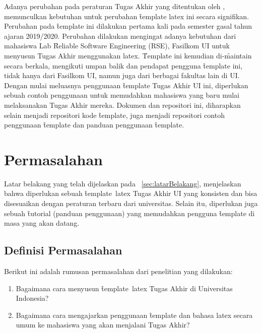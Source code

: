 Adanya perubahan pada peraturan Tugas Akhir yang ditentukan oleh \cite{ui:pedoman_ta}, memunculkan kebutuhan untuk perubahan \f{template} \gls{latex} ini secara signifikan.
Perubahan pada \f{template} ini dilakukan pertama kali pada semester gasal tahun ajaran 2019/2020.
Perubahan dilakukan mengingat adanya kebutuhan dari mahasiswa Lab \f{Reliable Software Engineering} (RSE), Fasilkom UI untuk menyusun Tugas Akhir menggunakan \gls{latex}.
\f{Template} ini kemudian di-\f{maintain} secara berkala, mengikuti umpan balik dan pendapat pengguna \f{template} ini, tidak hanya dari Fasilkom UI, namun juga dari berbagai fakultas lain di UI.
Dengan mulai meluasnya penggunaan \f{template} Tugas Akhir UI ini, diperlukan sebuah contoh penggunaan untuk memudahkan mahasiswa yang baru mulai melaksanakan Tugas Akhir mereka.
Dokumen dan repositori ini, diharapkan selain menjadi repositori kode \f{template}, juga menjadi repositori contoh penggunaan \f{template} dan panduan penggunaan \f{template}.



\section{Permasalahan}
\label{sec:masalah}

Latar belakang yang telah dijelaskan pada \sect~\ref{sec:latarBelakang}, menjelaskan bahwa diperlukan sebuah \f{template}~\gls{latex} Tugas Akhir UI yang konsisten dan bisa disesuaikan dengan peraturan terbaru dari universitas.
Selain itu, diperlukan juga sebuah \f{tutorial} (panduan penggunaan) yang memudahkan pengguna \f{template} di masa yang akan datang.

\subsection{Definisi Permasalahan}
\label{sec:definisiMasalah}
Berikut ini adalah rumusan permasalahan dari penelitian yang dilakukan:
\begin{enumerate}
	\item Bagaimana cara menyusun \f{template}~\gls{latex} Tugas Akhir di Universitas Indonesia?
	\item Bagaimana cara mengajarkan penggunaan \f{template} dan bahasa \gls{latex} secara umum ke mahasiswa yang akan menjalani Tugas Akhir?
\end{enumerate}

